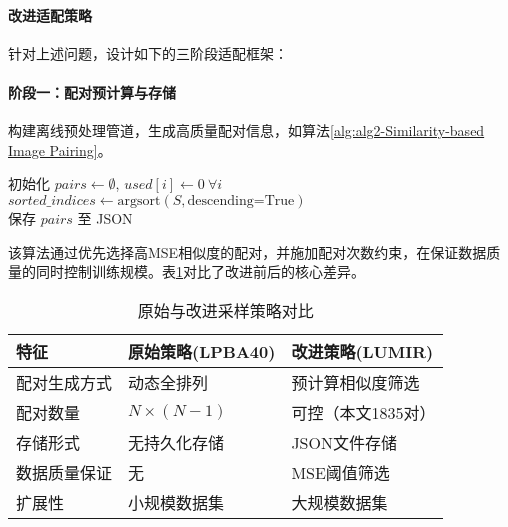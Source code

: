 \paragraph{改进适配策略}
针对上述问题，设计如下的三阶段适配框架：

\paragraph{阶段一：配对预计算与存储}


构建离线预处理管道，生成高质量配对信息，如算法\ref{alg:alg2-Similarity-based Image Pairing}。

\begin{algorithm}[h]
    \label{alg:alg2-Similarity-based Image Pairing}
    初始化 $pairs \gets \emptyset$, $used[i] \gets 0\ \forall i$ \\
    $sorted\_indices \gets \text{argsort}(S, \text{descending=True})$ \\
    保存 $pairs$ 至 JSON \\
\end{algorithm}

该算法通过优先选择高MSE相似度的配对，并施加配对次数约束，在保证数据质量的同时控制训练规模。表\ref{tab1}对比了改进前后的核心差异。

\begin{table}[!h]
    \centering
    \caption{原始与改进采样策略对比}
    \label{tab1}
    \begin{tabular}{lll}
        \toprule
        \textbf{特征} & \textbf{原始策略(LPBA40)} & \textbf{改进策略(LUMIR)} \\
        \midrule
        配对生成方式      & 动态全排列                 & 预计算相似度筛选             \\
        配对数量        & $N \times (N-1)$      & 可控（本文1835对）          \\
        存储形式        & 无持久化存储                & JSON文件存储             \\
        数据质量保证      & 无                     & MSE阈值筛选              \\
        扩展性         & 小规模数据集                & 大规模数据集               \\
        \bottomrule
    \end{tabular}
\end{table}



